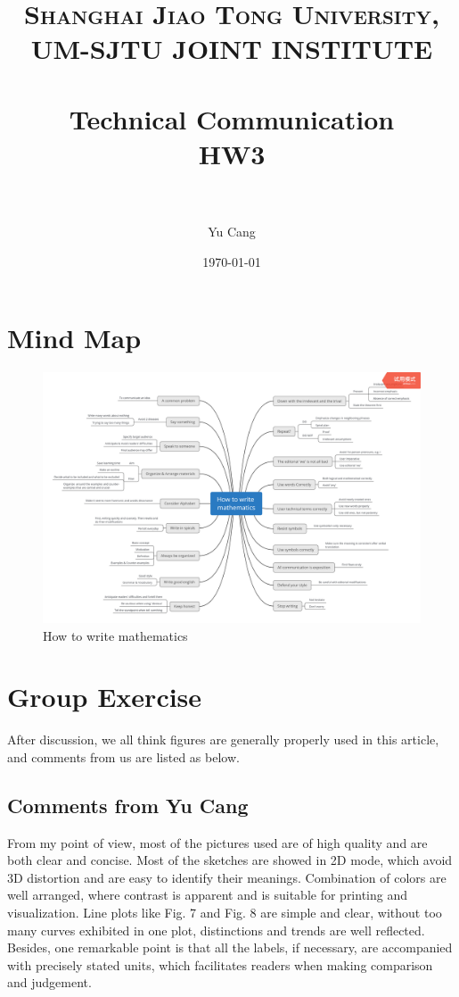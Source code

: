 \documentclass[paper=a4, fontsize=11pt]{scrartcl} %
\title{	
\normalfont \normalsize 
\textsc{Shanghai Jiao Tong University, UM-SJTU JOINT INSTITUTE} \\ [25pt] %
\horrule{0.5pt} \\[0.4cm] %
\huge Technical Communication\\ HW3 \\ %
\horrule{2pt} \\[0.5cm] %
}
\author{Yu Cang \quad 018370210001} %
\date{\normalsize \today} %
\numberwithin{equation}{section} %
\numberwithin{figure}{section} %
\numberwithin{table}{section} %
\begin{document}
\maketitle %

\section{Mind Map}
	\begin{figure}[!h]
		\centering
		\includegraphics[scale=0.11]{pic/mind_map.png}
		\caption{How to write mathematics}
		\label{fig:htwm}
	\end{figure}


\section{Group Exercise}
	After discussion, we all think figures are generally properly used in this article, and comments from us are listed as below.
	
	\subsection{Comments from Yu Cang}
		From my point of view, most of the pictures used are of high quality and are both clear and concise. Most of the sketches are showed in 2D mode, which avoid 3D distortion and are easy to identify their meanings. Combination of colors are well arranged, where contrast is apparent and is suitable for printing and visualization. Line plots like Fig. 7 and Fig. 8 are simple and clear, without too many curves exhibited in one plot, distinctions and trends are well reflected. Besides, one remarkable point is that all the labels, if necessary, are accompanied with precisely stated units, which facilitates readers when making comparison and judgement. \newline 
\end{document}
